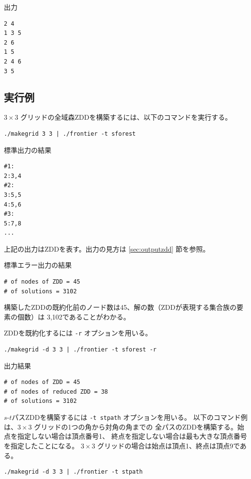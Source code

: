 \documentclass{jsarticle}
\begin{document}
出力

\begin{verbatim}
2 4
1 3 5
2 6
1 5
2 4 6
3 5
\end{verbatim}

\subsection{実行例}

$3 \times 3$ グリッドの全域森ZDDを構築するには、以下のコマンドを実行する。

\begin{verbatim}
./makegrid 3 3 | ./frontier -t sforest
\end{verbatim}

標準出力の結果

\begin{verbatim}
#1:
2:3,4
#2:
3:5,5
4:5,6
#3:
5:7,8
...
\end{verbatim}

上記の出力はZDDを表す。出力の見方は \ref{sec:outputzdd} 節を参照。

標準エラー出力の結果

\begin{verbatim}
# of nodes of ZDD = 45
# of solutions = 3102
\end{verbatim}

構築したZDDの既約化前のノード数は45、解の数（ZDDが表現する集合族の要素の個数）は
3,102であることがわかる。

ZDDを既約化するには \texttt{-r} オプションを用いる。

\begin{verbatim}
./makegrid -d 3 3 | ./frontier -t sforest -r
\end{verbatim}

出力結果

\begin{verbatim}
# of nodes of ZDD = 45
# of nodes of reduced ZDD = 38
# of solutions = 3102
\end{verbatim}

$s$-$t$パスZDDを構築するには \texttt{-t stpath} オプションを用いる。
以下のコマンド例は、$3 \times 3$ グリッドの1つの角から対角の角までの
全パスのZDDを構築する。始点を指定しない場合は頂点番号1、
終点を指定しない場合は最も大きな頂点番号を指定したことになる。
$3 \times 3$ グリッドの場合は始点は頂点1、終点は頂点9である。

\begin{verbatim}
./makegrid -d 3 3 | ./frontier -t stpath
\end{verbatim}
\end{document}
